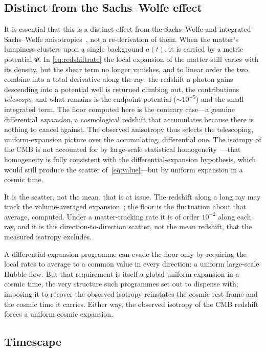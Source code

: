 \documentclass[aps,prd,reprint,amsmath,amssymb,superscriptaddress]{revtex4-2}
\begin{document}
\subsection{Distinct from the Sachs--Wolfe effect}\label{sec:sw}

It is essential that this is a distinct effect from the Sachs--Wolfe and integrated Sachs--Wolfe anisotropies~\cite{Sachs1967, Rees1968}, not a re-derivation of them. When the matter's lumpiness clusters upon a single background $a(t)$, it is carried by a metric potential $\Phi$. In \eqref{eq:redshiftrate} the local expansion of the matter still varies with its density, but the shear term no longer vanishes, and to linear order the two combine into a total derivative along the ray: the redshift a photon gains descending into a potential well is returned climbing out, the contributions \emph{telescope}, and what remains is the endpoint potential ($\sim\!10^{-5}$) and the small integrated term. The floor computed here is the contrary case---a genuine differential \emph{expansion}, a cosmological redshift that accumulates because there is nothing to cancel against. The observed anisotropy thus selects the telescoping, uniform-expansion picture over the accumulating, differential one. The isotropy of the CMB is not accounted for by large-scale statistical homogeneity~\cite{Scrimgeour2012}---that homogeneity is fully consistent with the differential-expansion hypothesis, which would still produce the scatter of~\eqref{eq:value}---but by uniform expansion in a cosmic time.

It is the scatter, not the mean, that is at issue. The redshift along a long ray may track the volume-averaged expansion~\cite{Rasanen2009}; the floor is the fluctuation about that average, computed. Under a matter-tracking rate it is of order $10^{-2}$ along each ray, and it is this direction-to-direction scatter, not the mean redshift, that the measured isotropy excludes.

A differential-expansion programme can evade the floor only by requiring the local rates to average to a common value in every direction: a uniform large-scale Hubble flow. But that requirement is itself a global uniform expansion in a cosmic time, the very structure such programmes set out to dispense with; imposing it to recover the observed isotropy reinstates the cosmic rest frame and the cosmic time it carries. Either way, the observed isotropy of the CMB redshift forces a uniform cosmic expansion.

\subsection{Timescape}\label{sec:timescape}
\end{document}
